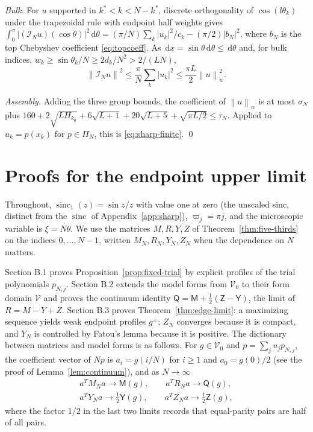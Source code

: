 \documentclass{siamart251216}
\newcommand{\Pn}{\Pi}
\newcommand{\norm}[1]{\left\lVert#1\right\rVert}
\newcommand{\dd}{\,\mathrm d}
\begin{document}
\emph{Bulk.} For $u$ supported in $k^\ast<k<N-k^\ast$, discrete orthogonality of
$\cos(l\theta_k)$ under the trapezoidal rule with endpoint half weights gives
$\int_0^\pi|(\mathcal I_Nu)(\cos\theta)|^2\dd\theta=(\pi/N)\sum_k|u_k|^2/c_k-
(\pi/2)|b_N|^2$, where $b_N$ is the top Chebyshev coefficient \eqref{eq:topcoeff}. As
$\dd x=\sin\theta\dd\theta\le\dd\theta$ and, for bulk indices,
$w_k\ge\sin\theta_k/N\ge2d_k/N^2>2/(LN)$,
\[
 \norm{\mathcal I_Nu}^2\le\frac\pi N\sum_k|u_k|^2\le\frac{\pi L}2\norm u_w^2 .
\]

\emph{Assembly.} Adding the three group bounds, the coefficient of
$\norm u_w$ is at most $\sigma_N$ plus
$160+2\sqrt{LH_{k_0}}+6\sqrt{L+1}+20\sqrt{L+5}+\sqrt{\pi L/2}\le\tau_N$.
Applied to $u_k=p(x_k)$ for $p\in\Pn_N$, this is \eqref{eq:sharp-finite}. \qed

\section{Proofs for the endpoint upper limit}\label{app:edge}

Throughout, $\operatorname{sinc}_1(z)=\sin z/z$ with value one at zero
(the unscaled sinc, distinct from the $\operatorname{sinc}$ of
Appendix~\ref{app:sharp}), $\varpi_j=\pi j$, and the microscopic variable is
$\xi=N\theta$. We use the matrices $M,R,Y,Z$ of
Theorem~\ref{thm:five-thirds} on the indices $0,\dots,N-1$, written
$M_N,R_N,Y_N,Z_N$ when the dependence on $N$ matters.

Section B.1 proves Proposition~\ref{prop:fixed-trial} by explicit profiles of
the trial polynomials $p_{N,j}$. Section B.2 extends the model forms from
$\mathcal V_0$ to their form domain $\mathcal V$ and proves the continuum
identity $\mathsf Q=\mathsf M+\tfrac12(\mathsf Z-\mathsf Y)$, the limit of
$R=M-Y+Z$. Section B.3 proves Theorem~\ref{thm:edge-limit}: a maximizing
sequence yields weak endpoint profiles $g^\pm$; $Z_N$ converges because it is
compact, and $Y_N$ is controlled by Fatou's lemma because it is positive. The
dictionary between matrices and model forms is as follows. For
$g\in\mathcal V_0$ and $p=\sum_ju_jp_{N,j}$, the coefficient vector of $Np$ is
$a_i=g(i/N)$ for $i\ge1$ and $a_0=g(0)/2$ (see the proof of
Lemma~\ref{lem:continuum}), and as $N\to\infty$
\begin{gather*}
 a^TM_Na\to\mathsf M(g),\qquad
 a^TR_Na\to\mathsf Q(g),\\
 a^TY_Na\to\tfrac12\mathsf Y(g),\qquad
 a^TZ_Na\to\tfrac12\mathsf Z(g),
\end{gather*}
where the factor $1/2$ in the last two limits records that equal-parity pairs
are half of all pairs.
\end{document}
